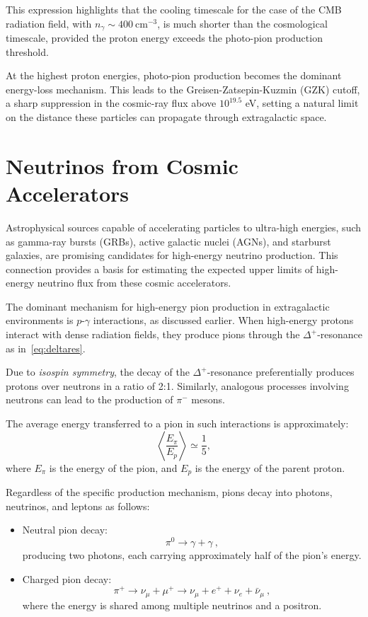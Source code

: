 This expression highlights that the cooling timescale for the case of the CMB radiation field, with \( n_\gamma \sim 400~\text{cm}^{-3} \), is much shorter than the cosmological timescale, provided the proton energy exceeds the photo-pion production threshold.

At the highest proton energies, photo-pion production becomes the dominant energy-loss mechanism. This leads to the Greisen-Zatsepin-Kuzmin (GZK) cutoff, a sharp suppression in the cosmic-ray flux above \( 10^{19.5} \) eV, setting a natural limit on the distance these particles can propagate through extragalactic space.

\section{Neutrinos from Cosmic Accelerators}

Astrophysical sources capable of accelerating particles to ultra-high energies, such as gamma-ray bursts (GRBs), active galactic nuclei (AGNs), and starburst galaxies, are promising candidates for high-energy neutrino production. This connection provides a basis for estimating the expected upper limits of high-energy neutrino flux from these cosmic accelerators.  

The dominant mechanism for high-energy pion production in extragalactic environments is \(p\)-\(\gamma\) interactions, as discussed earlier. When high-energy protons interact with dense radiation fields, they produce pions through the \(\Delta^+\)-resonance as in~\cref{eq:deltares}.

Due to \emph{isospin symmetry}, the decay of the \(\Delta^+\)-resonance preferentially produces protons over neutrons in a ratio of 2:1. Similarly, analogous processes involving neutrons can lead to the production of \(\pi^-\) mesons.

The average energy transferred to a pion in such interactions is approximately:
\begin{equation}
\left\langle \frac{E_\pi}{E_p} \right\rangle \simeq \frac{1}{5},
\end{equation}
where \(E_\pi\) is the energy of the pion, and \(E_p\) is the energy of the parent proton.

Regardless of the specific production mechanism, pions decay into photons, neutrinos, and leptons as follows:  
\begin{itemize}
\item Neutral pion decay:  
\begin{equation} \pi^0 \rightarrow \gamma + \gamma~, \end{equation}
producing two photons, each carrying approximately half of the pion's energy.
\item Charged pion decay:  
\begin{equation} \pi^+ \rightarrow \nu_\mu + \mu^+ \rightarrow \nu_\mu + e^+ + \nu_e + \bar{\nu}_\mu~, \end{equation}
where the energy is shared among multiple neutrinos and a positron.
\end{itemize}

